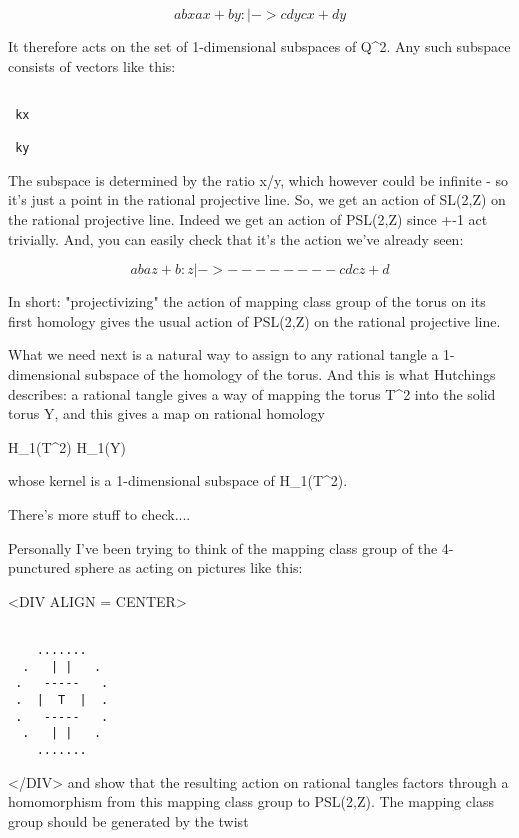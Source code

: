 $$

 a  b      x       ax + by
       :      |->     
 c  d      y       cx + dy
$$
    
It therefore acts on the set of 1-dimensional subspaces of Q^{2}.
Any such subspace consists of vectors like this:

\begin{verbatim}

 kx 

 ky 
\end{verbatim}
    
The subspace is determined by the ratio x/y, which however could be 
infinite - so it's just a point in the rational projective line.  So,
we get an action of SL(2,Z) on the rational projective line.  Indeed
we get an action of PSL(2,Z) since +-1 act trivially.  And, you can 
easily check that it's the action we've already seen:


$$

 a  b             az + b
       : z  |->  --------
 c  d             cz + d
$$
    
In short: "projectivizing" the action of mapping class group of the 
torus on its first homology gives the usual action of PSL(2,Z) on the 
rational projective line.  

What we need next is a natural way to assign to any rational tangle 
a 1-dimensional subspace of the homology of the torus.  And this is 
what Hutchings describes: a rational tangle gives a way of mapping 
the torus T^{2} into the solid torus Y, and this gives a 
map on rational homology

H_{1}(T^{2}) \to  H_{1}(Y)

whose kernel is a 1-dimensional subspace of H_{1}(T^{2}).   

There's more stuff to check....
 
Personally I've been trying to think of the mapping class group 
of the 4-punctured sphere as acting on pictures like this: 

<DIV ALIGN = CENTER>

\begin{verbatim}

    .......   
  .   | |   . 
 .   -----   .
 .  |  T  |  .
 .   -----   .
  .   | |   . 
    .......   
\end{verbatim}
    
</DIV>
and show that the resulting action on rational tangles factors
through a homomorphism from this mapping class group to PSL(2,Z).
The mapping class group should be generated by the twist 



